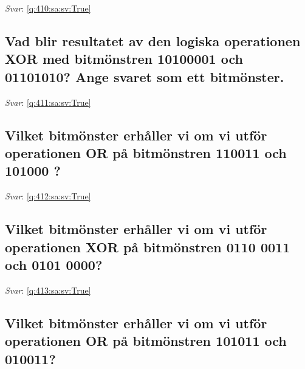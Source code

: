 \documentclass[a4paper,11pt,oneside]{article}
\begin{document}
\begin{sloppypar}
\vspace{1cm}

\textit{Svar}: \autoref{q:410:sa:sv:True}



\subsection{Vad blir resultatet av den logiska operationen XOR med bitm\"onstren 10100001 och 01101010? Ange svaret som ett bitm\"onster.}

\label{q:411:sa:sv:False}

\vspace{2cm}

\noindent\makebox[\textwidth]{\hrulefill}

\vspace{1cm}

\textit{Svar}: \autoref{q:411:sa:sv:True}



\subsection{Vilket bitm\"onster erh\r{a}ller vi om vi utf\"or operationen OR p\r{a} bitm\"onstren 110011 och 101000 ?}

\label{q:412:sa:sv:False}

\vspace{2cm}

\noindent\makebox[\textwidth]{\hrulefill}

\vspace{1cm}

\textit{Svar}: \autoref{q:412:sa:sv:True}



\subsection{Vilket bitm\"onster erh\r{a}ller vi om vi utf\"or operationen XOR p\r{a} bitm\"onstren 0110 0011 och 0101 0000?}

\label{q:413:sa:sv:False}

\vspace{2cm}

\noindent\makebox[\textwidth]{\hrulefill}

\vspace{1cm}

\textit{Svar}: \autoref{q:413:sa:sv:True}



\subsection{Vilket bitm\"onster erh\r{a}ller vi om vi utf\"or operationen OR p\r{a} bitm\"onstren 101011 och 010011?}


\end{sloppypar}
\end{document}
